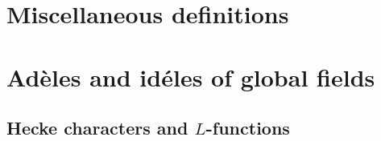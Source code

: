 \appendix

\section{Miscellaneous definitions}








\section{Ad\`eles and id\'eles of global fields }




















\subsection{Hecke characters and $L$-functions}









